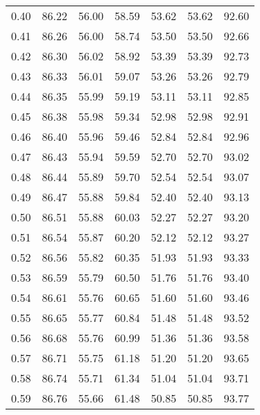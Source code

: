 \begin{tabular}{|c|c|c|c|c|c|c|}
      0.40 &     86.22 &     56.00 &      58.59 &   53.62 &      53.62 &         92.60 \\
      0.41 &     86.26 &     56.00 &      58.74 &   53.50 &      53.50 &         92.66 \\
      0.42 &     86.30 &     56.02 &      58.92 &   53.39 &      53.39 &         92.73 \\
      0.43 &     86.33 &     56.01 &      59.07 &   53.26 &      53.26 &         92.79 \\
      0.44 &     86.35 &     55.99 &      59.19 &   53.11 &      53.11 &         92.85 \\
      0.45 &     86.38 &     55.98 &      59.34 &   52.98 &      52.98 &         92.91 \\
      0.46 &     86.40 &     55.96 &      59.46 &   52.84 &      52.84 &         92.96 \\
      0.47 &     86.43 &     55.94 &      59.59 &   52.70 &      52.70 &         93.02 \\
      0.48 &     86.44 &     55.89 &      59.70 &   52.54 &      52.54 &         93.07 \\
      0.49 &     86.47 &     55.88 &      59.84 &   52.40 &      52.40 &         93.13 \\
      0.50 &     86.51 &     55.88 &      60.03 &   52.27 &      52.27 &         93.20 \\
      0.51 &     86.54 &     55.87 &      60.20 &   52.12 &      52.12 &         93.27 \\
      0.52 &     86.56 &     55.82 &      60.35 &   51.93 &      51.93 &         93.33 \\
      0.53 &     86.59 &     55.79 &      60.50 &   51.76 &      51.76 &         93.40 \\
      0.54 &     86.61 &     55.76 &      60.65 &   51.60 &      51.60 &         93.46 \\
      0.55 &     86.65 &     55.77 &      60.84 &   51.48 &      51.48 &         93.52 \\
      0.56 &     86.68 &     55.76 &      60.99 &   51.36 &      51.36 &         93.58 \\
      0.57 &     86.71 &     55.75 &      61.18 &   51.20 &      51.20 &         93.65 \\
      0.58 &     86.74 &     55.71 &      61.34 &   51.04 &      51.04 &         93.71 \\
      0.59 &     86.76 &     55.66 &      61.48 &   50.85 &      50.85 &         93.77 \\

\end{tabular}
